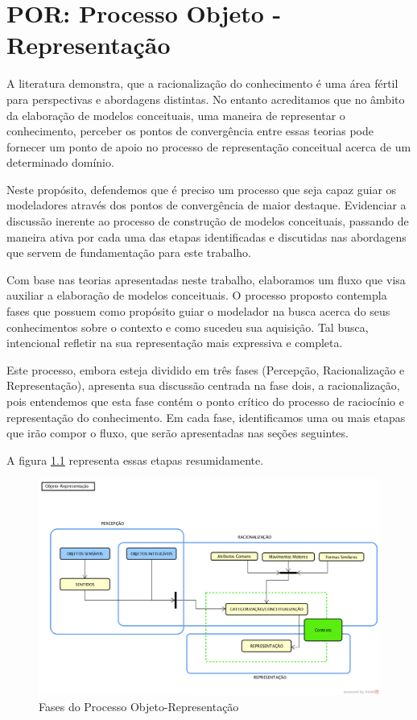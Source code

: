 

\chapter{\hspace*{3pt} POR: Processo Objeto - Representação}
\label{chap:por}

A literatura demonstra, que a racionalização do conhecimento é uma área fértil para perspectivas e abordagens distintas. No entanto acreditamos que no âmbito da elaboração de modelos conceituais, uma maneira de representar o conhecimento, perceber os pontos de convergência entre essas teorias pode fornecer um ponto de apoio no processo de representação conceitual acerca de um determinado domínio.

Neste propósito, defendemos que é preciso um processo que seja capaz guiar os modeladores através dos pontos de convergência de maior destaque. Evidenciar a discussão inerente ao processo de construção de modelos conceituais, passando de maneira ativa por cada uma das etapas identificadas e discutidas nas abordagens que servem de fundamentação para este trabalho.

Com base nas teorias apresentadas neste trabalho, elaboramos um fluxo que visa auxiliar a elaboração de modelos conceituais. O processo proposto contempla fases que possuem como propósito guiar o modelador na busca acerca do seus conhecimentos sobre o contexto e como sucedeu sua aquisição. Tal busca, intencional refletir na sua representação mais expressiva e completa.

Este processo, embora esteja dividido em três fases (Percepção, Racionalização e Representação), apresenta sua discussão centrada na fase dois, a racionalização, pois entendemos que esta fase contém o ponto crítico do processo de raciocínio e representação do conhecimento. Em cada fase, identificamos uma ou mais etapas que irão compor o fluxo, que serão apresentadas nas seções seguintes.

A figura \ref{fig:por-resumido} representa essas etapas resumidamente.
\begin{figure}
    \centering
    \includegraphics[width=\textwidth]{imagens/Fases_Processo_O-R.png}
    \caption{Fases do Processo Objeto-Representação}
    \label{fig:por-resumido}
\end{figure}

